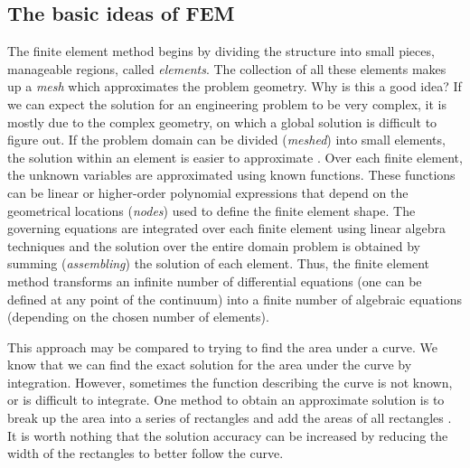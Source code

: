 	\subsection{The basic ideas of FEM}
The finite element method begins by dividing the structure into small pieces, manageable regions, called \emph{elements}. The collection of all these elements makes up a \emph{mesh} which approximates the problem geometry. Why is this a good idea? If we can expect the solution for an engineering problem to be very complex, it is mostly due to the complex geometry, on which a global solution is difficult to figure out. If the problem domain can be divided (\emph{meshed}) into small elements, the solution within an element is easier to approximate \citep{MacDonald07}. Over each finite element, the unknown variables are approximated using known functions. These functions can be linear or higher-order polynomial expressions that depend on the geometrical locations (\emph{nodes}) used to define the finite element shape. The governing equations are integrated over each finite element using linear algebra techniques and the solution over the entire domain problem is obtained by summing (\emph{assembling}) the solution of each element. Thus, the finite element method transforms an infinite number of differential equations (one can be defined at any point of the continuum) into a finite number of algebraic equations (depending on the chosen number of elements). 

This approach may be compared to trying to find the area under a curve. We know that we can find the exact solution for the area under the curve by integration. However, sometimes the function describing the curve is not known, or is difficult to integrate. One method to obtain an approximate solution is to break up the area into a series of rectangles and add the areas of all rectangles . It is worth nothing that the solution accuracy can be increased by reducing the width of the rectangles to better follow the curve. 

\medskip

